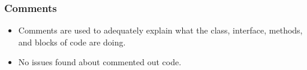 \subsubsection{Comments}
\begin{itemize}
\item Comments are used to adequately explain what the class, interface,
methods, and blocks of code are doing. 
\item No issues found about commented out code. 
\end{itemize}





